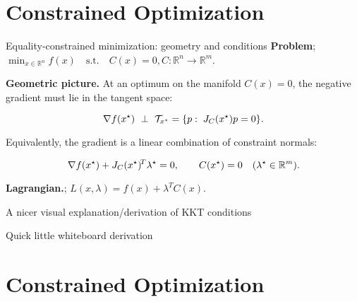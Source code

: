 
\section{Constrained Optimization}


\begin{frame}{Equality-constrained minimization: geometry and conditions}
\textbf{Problem}; $\min_{x\in\mathbb{R}^n} f(x)\quad \text{s.t.}\quad C(x)=0, C:\mathbb{R}^n\to\mathbb{R}^m$.

\medskip
\textbf{Geometric picture.} At an optimum on the manifold $C(x)=0$, the negative gradient must lie in the tangent space:

$$
\grad f(x^\star)\ \perp\ \mathcal{T}_{x^\star}=\{p:\; J_C(x^\star)p=0\}.
$$

Equivalently, the gradient is a linear combination of constraint normals:

$$
\nabla f(x^\star)+J_C(x^\star)^{\!T}\lambda^\star=0,\qquad C(x^\star)=0\quad(\lambda^\star\in\mathbb{R}^m).
$$

\medskip
\textbf{Lagrangian.}; $L(x,\lambda)=f(x)+\lambda^{\!T}C(x)$.
\end{frame}

\begin{frame}{A nicer visual explanation/derivation of KKT conditions}
\begin{center}
    Quick little whiteboard derivation
\end{center}
    
\end{frame}



\section{Constrained Optimization}

